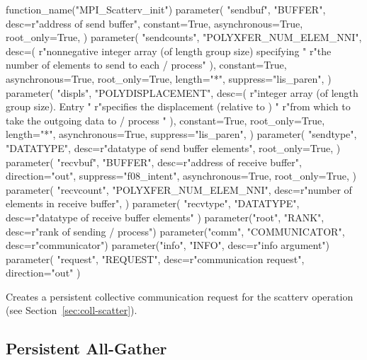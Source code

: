 \begin{mpi-binding}
    function_name("MPI_Scatterv_init")
    parameter(
        "sendbuf",
        "BUFFER",
        desc=r"address of send buffer",
        constant=True,
        asynchronous=True,
        root_only=True,
    )
    parameter(
        "sendcounts",
        "POLYXFER_NUM_ELEM_NNI",
        desc=(
            r"nonnegative integer array (of length group size) specifying "
            r"the number of elements to send to each \MPI/ process"
        ),
        constant=True,
        asynchronous=True,
        root_only=True,
        length="*",
        suppress="lis_paren",
    )
    parameter(
        "displs",
        "POLYDISPLACEMENT",
        desc=(
            r"integer array (of length group size). Entry  "
            r"specifies the displacement (relative to ) "
            r"from which to take the outgoing data to \MPI/ process "
        ),
        constant=True,
        root_only=True,
        length="*",
        asynchronous=True,
        suppress="lis_paren",
    )
    parameter(
        "sendtype",
        "DATATYPE",
        desc=r"datatype of send buffer elements",
        root_only=True,
    )
    parameter(
        "recvbuf",
        "BUFFER",
        desc=r"address of receive buffer",
        direction="out",
        suppress="f08_intent",
        asynchronous=True,
        root_only=True,
    )
    parameter(
        "recvcount",
        "POLYXFER_NUM_ELEM_NNI",
        desc=r"number of elements in receive buffer",
    )
    parameter(
        "recvtype", "DATATYPE", desc=r"datatype of receive buffer elements"
    )
    parameter("root", "RANK", desc=r"rank of sending \MPI/ process")
    parameter("comm", "COMMUNICATOR", desc=r"communicator")
    parameter("info", "INFO", desc=r"info argument")
    parameter(
        "request", "REQUEST", desc=r"communication request", direction="out"
    )
\end{mpi-binding}

Creates a persistent collective communication request for the scatterv operation
(see Section~\ref{sec:coll-scatter}).


\subsection{Persistent All-Gather}
\label{sec:pcoll-allcast}


